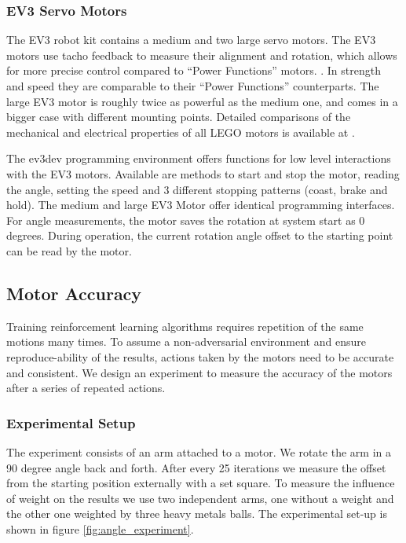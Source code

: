 \documentclass[11pt, a4paper]{article}
\begin{document}
\subsubsection*{EV3 Servo Motors}
The EV3 robot kit contains a medium and two large servo motors. The EV3 motors use tacho feedback to measure their alignment and rotation, which allows for more precise control compared to ``Power Functions'' motors. \cite{Servo_Motor}. In strength and speed they are comparable to their ``Power Functions'' counterparts. The large EV3 motor is roughly twice as powerful as the medium one, and comes in a bigger case with different mounting points. Detailed comparisons of the mechanical and electrical properties of all LEGO motors is available at \cite{motor_comparison}.

The ev3dev programming environment offers functions for low level interactions with the EV3 motors. Available are methods to start and stop the motor, reading the angle, setting the speed and 3 different stopping patterns (coast, brake and hold). The medium and large EV3 Motor offer identical programming interfaces. For angle measurements, the motor saves the rotation at system start as 0 degrees. During operation, the current rotation angle offset to the starting point can be read by the motor. \cite{ev3_python}

\subsection*{Motor Accuracy}
Training reinforcement learning algorithms requires repetition of the same motions many times. To assume a non-adversarial environment and ensure reproduce-ability of the results, actions taken by the motors need to be accurate and consistent. We design an experiment to measure the accuracy of the motors after a series of repeated actions.

\subsubsection*{Experimental Setup}
The experiment consists of an arm attached to a motor. We rotate the arm in a 90 degree angle back and forth. After every 25 iterations we measure the offset from the starting position externally with a set square. To measure the influence of weight on the results we use two independent arms, one without a weight and the other one weighted by three heavy metals balls. The experimental set-up is shown in figure \ref{fig:angle_experiment}.
\end{document}
